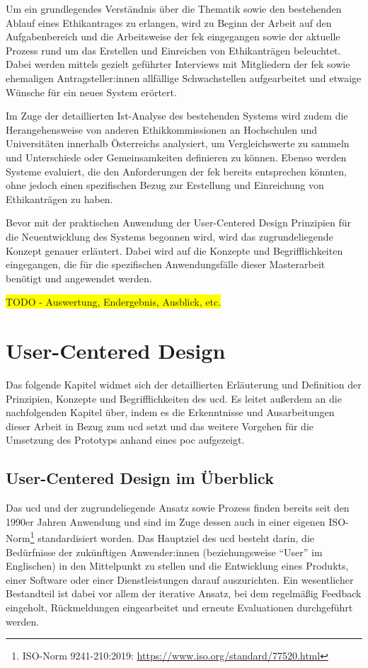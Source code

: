 \documentclass[a4paper,12pt,twoside]{scrreprt}
\begin{document}
Um ein grundlegendes Verständnis über die Thematik sowie den bestehenden Ablauf eines Ethikantrages zu erlangen, wird zu Beginn der Arbeit auf den Aufgabenbereich und die Arbeitsweise der \acl{fek} eingegangen sowie der aktuelle Prozess rund um das Erstellen und Einreichen von Ethikanträgen beleuchtet. Dabei werden mittels gezielt geführter Interviews mit Mitgliedern der \acl{fek} sowie ehemaligen Antragsteller:innen allfällige Schwachstellen aufgearbeitet und etwaige Wünsche für ein neues System erörtert.

Im Zuge der detaillierten Ist-Analyse des bestehenden Systems wird zudem die Herangehensweise von anderen Ethikkommissionen an Hochschulen und Universitäten innerhalb Österreichs analysiert, um Vergleichswerte zu sammeln und Unterschiede oder Gemeinsamkeiten definieren zu können. Ebenso werden Systeme evaluiert, die den Anforderungen der \acl{fek} bereits entsprechen könnten, ohne jedoch einen spezifischen Bezug zur Erstellung und Einreichung von Ethikanträgen zu haben.

Bevor mit der praktischen Anwendung der User-Centered Design Prinzipien für die Neuentwicklung des Systems begonnen wird, wird das zugrundeliegende Konzept genauer erläutert. Dabei wird auf die Konzepte und Begrifflichkeiten eingegangen, die für die spezifischen Anwendungsfälle dieser Masterarbeit benötigt und angewendet werden.

\colorbox{yellow}{TODO - Auswertung, Endergebnis, Ausblick, etc.}

\cleardoublepage
\chapter{User-Centered Design}
\label{chap:user-centered-design}

Das folgende Kapitel widmet sich der detaillierten Erläuterung und Definition der Prinzipien, Konzepte und Begrifflichkeiten des \ac{ucd}. Es leitet außerdem an die nachfolgenden Kapitel über, indem es die Erkenntnisse und Ausarbeitungen dieser Arbeit in Bezug zum \acl{ucd} setzt und das weitere Vorgehen für die Umsetzung des Prototyps anhand eines \ac{poc} aufgezeigt.

\section{User-Centered Design im Überblick}
\label{sec:überblick-ucd}

Das \ac{ucd} und der zugrundeliegende Ansatz sowie Prozess finden bereits seit den 1990er Jahren Anwendung und sind im Zuge dessen auch in einer eigenen ISO-Norm\footnote{ISO-Norm 9241-210:2019: \url{https://www.iso.org/standard/77520.html}} standardisiert worden. Das Hauptziel des \ac{ucd} besteht darin, die Bedürfnisse der zukünftigen Anwender:innen (beziehungsweise \enquote{User} im Englischen) in den Mittelpunkt zu stellen und die Entwicklung eines Produkts, einer Software oder einer Dienstleistungen darauf auszurichten. Ein wesentlicher Bestandteil ist dabei vor allem der iterative Ansatz, bei dem regelmäßig Feedback eingeholt, Rückmeldungen eingearbeitet und erneute Evaluationen durchgeführt werden. \cite{frieling_user_2019}
\end{document}
